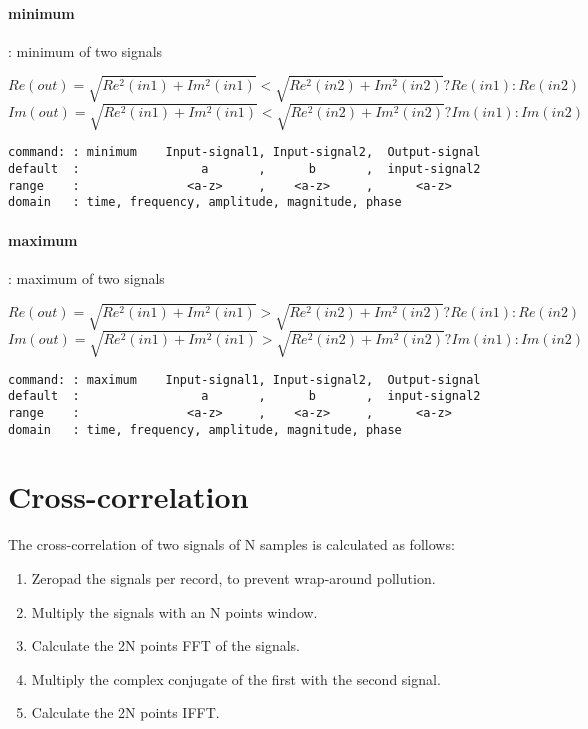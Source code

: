 \documentclass{report}
\newcommand{\bc}{\scriptsize}
\newcommand{\ec}{\normalsize}
\begin{document}
\paragraph{minimum}: minimum of two signals

\[ Re(out) = \sqrt{Re^{2}(in1) + Im^{2}(in1)} < \sqrt{Re^{2}(in2) + Im^{2}(in2)} ? Re(in1) : Re(in2) \]
\[ Im(out) = \sqrt{Re^{2}(in1) + Im^{2}(in1)} < \sqrt{Re^{2}(in2) + Im^{2}(in2)} ? Im(in1) : Im(in2) \]

\bc
\begin{verbatim}
command: : minimum    Input-signal1, Input-signal2,  Output-signal
default  :                 a       ,      b       ,  input-signal2
range    :               <a-z>     ,    <a-z>     ,      <a-z>
domain   : time, frequency, amplitude, magnitude, phase
\end{verbatim}
\ec

\paragraph{maximum}: maximum of two signals

\[ Re(out) = \sqrt{Re^{2}(in1) + Im^{2}(in1)} > \sqrt{Re^{2}(in2) + Im^{2}(in2)} ? Re(in1) : Re(in2) \]
\[ Im(out) = \sqrt{Re^{2}(in1) + Im^{2}(in1)} > \sqrt{Re^{2}(in2) + Im^{2}(in2)} ? Im(in1) : Im(in2) \]

\bc
\begin{verbatim}
command: : maximum    Input-signal1, Input-signal2,  Output-signal
default  :                 a       ,      b       ,  input-signal2
range    :               <a-z>     ,    <a-z>     ,      <a-z>
domain   : time, frequency, amplitude, magnitude, phase
\end{verbatim}
\ec

\section{Cross-correlation}

The cross-correlation of two signals of N samples is calculated as follows:

\begin{enumerate}
  \item Zeropad the signals per record, to prevent wrap-around pollution.
  \item Multiply the signals with an N points window.
  \item Calculate the 2N points FFT of the signals.
  \item Multiply the complex conjugate of the first with the second signal.
  \item Calculate the 2N points IFFT.
\end{enumerate}
\end{document}
